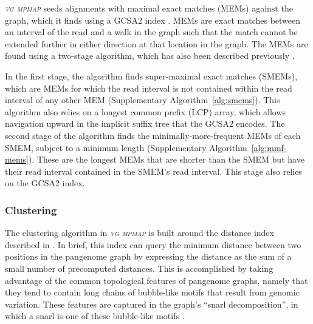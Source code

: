 \documentclass[11pt]{ucthesis}
\newcommand{\tool}[1]{\emph{\textsc{#1}}}
\begin{document}
\tool{vg mpmap} seeds alignments with maximal exact matches (MEMs) against the graph, which it finds using a GCSA2 index \cite{siren2017indexing}. MEMs are exact matches between an interval of the read and a walk in the graph such that the match cannot be extended further in either direction at that location in the graph. The MEMs are found using a two-stage algorithm, which has also been described previously \cite{garrison2018variation}. 

In the first stage, the algorithm finds super-maximal exact matches (SMEMs), which are MEMs for which the read interval is not contained within the read interval of any other MEM (Supplementary Algorithm~\ref{alg:smems}). This algorithm also relies on a longest common prefix (LCP) array, which allows navigation upward in the implicit suffix tree that the GCSA2 encodes. The second stage of the algorithm finds the minimally-more-frequent MEMs of each SMEM, subject to a minimum length (Supplementary Algorithm~\ref{alg:mmf-mems}). These are the longest MEMs that are shorter than the SMEM but have their read interval contained in the SMEM's read interval. This stage also relies on the GCSA2 index.

\subsubsection{Clustering}

The clustering algorithm in \tool{vg mpmap} is built around the distance index described in \cite{chang2020distance}. In brief, this index can query the minimum distance between two positions in the pangenome graph by expressing the distance as the sum of a small number of precomputed distances. This is accomplished by taking advantage of the common topological features of pangenome graphs, namely that they tend to contain long chains of bubble-like motifs that result from genomic variation. These features are captured in the graph's ``snarl decomposition'', in which a snarl is one of these bubble-like motifs \cite{paten2018superbubbles}.
\end{document}

